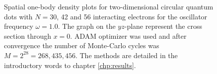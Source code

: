 \begin{landscape}
\begin{figure} [H]
		\hspace{0.1cm}
		\hspace{-0.0cm}
		\hspace{-0.0cm}
		\hspace{-0.0cm}
		
		\caption{Spatial one-body density plots for two-dimensional circular quantum dots with $N=30$, 42 and 56 interacting electrons for the oscillator frequency $\omega=1.0$. The graph on the $yz$-plane represent the cross section through $x=0$. ADAM optimizer was used and after convergence the number of Monte-Carlo cycles was $M=2^{28}=268,435,456$. The methods are detailed in the introductory words to chapter \ref{chp:results}.}%
		\label{fig:OB2_interaction_large}
	\end{figure}
\end{landscape}

